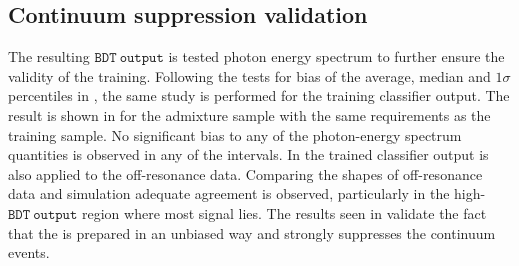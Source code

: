 \subsection{Continuum suppression validation}\label{sec:continuum_validation}

The resulting $\mathtt{BDT~output}$ is tested photon energy spectrum to further ensure the validity of the training.
Following the tests for bias of the average, median and $1\sigma$ percentiles in ,
the same study is performed for the training classifier output.
The result is shown in  for the \BtoXsgamma admixture sample with the same requirements as the training sample.
No significant bias to any of the photon-energy spectrum quantities is observed in any of the intervals.
In  the trained classifier output is also applied to the off-resonance data.
Comparing the shapes of off-resonance data and simulation adequate agreement is observed, particularly in the high-$\mathtt{BDT~output}$ region where most signal lies.
The results seen in  validate the fact that the \BDT is prepared in an unbiased way and strongly suppresses the continuum events.
